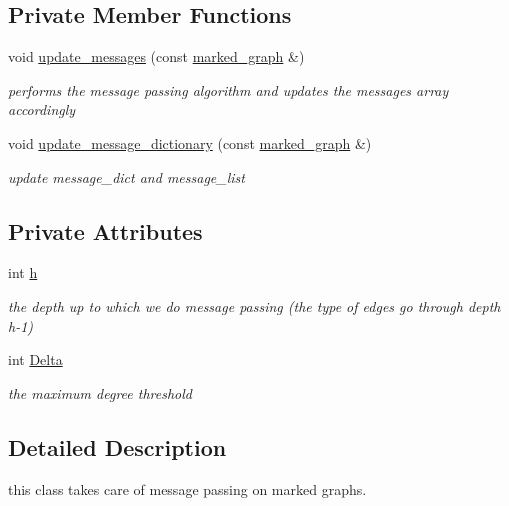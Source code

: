 \subsection*{Private Member Functions}
\begin{DoxyCompactItemize}
\item 
void \hyperlink{classgraph__message_a40dadc59d582b290202e79bc4a9e896c}{update\+\_\+messages} (const \hyperlink{classmarked__graph}{marked\+\_\+graph} \&)
\begin{DoxyCompactList}\small\item\em performs the message passing algorithm and updates the messages array accordingly \end{DoxyCompactList}\item 
void \hyperlink{classgraph__message_a77d137b371134e292283fdd78634f4d4}{update\+\_\+message\+\_\+dictionary} (const \hyperlink{classmarked__graph}{marked\+\_\+graph} \&)
\begin{DoxyCompactList}\small\item\em update message\+\_\+dict and message\+\_\+list \end{DoxyCompactList}\end{DoxyCompactItemize}
\subsection*{Private Attributes}
\begin{DoxyCompactItemize}
\item 
int \hyperlink{classgraph__message_a934d63ed7275c211e13c6fb68824ed46}{h}
\begin{DoxyCompactList}\small\item\em the depth up to which we do message passing (the type of edges go through depth h-\/1) \end{DoxyCompactList}\item 
int \hyperlink{classgraph__message_a45dfd061b7bc73572e5132fbf66efd55}{Delta}
\begin{DoxyCompactList}\small\item\em the maximum degree threshold \end{DoxyCompactList}\end{DoxyCompactItemize}


\subsection{Detailed Description}
this class takes care of message passing on marked graphs. 

